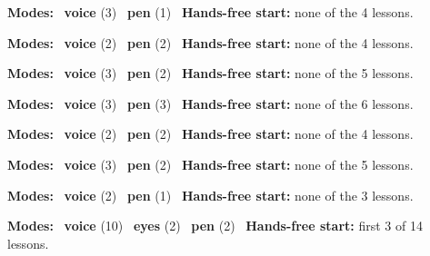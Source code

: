 \expandafter\def\csname hlchaptermodality5\endcsname{%
  {\small\noindent
    \textbf{Modes:} \hlvoicesign{}~\textbf{voice} (3) \quad \hlpensign{}~\textbf{pen} (1)\quad
    \hlvoicesign{}~\textbf{Hands-free start:} none of the 4 lessons.%
    \par}\medskip
}

\expandafter\def\csname hlchaptermodality6\endcsname{%
  {\small\noindent
    \textbf{Modes:} \hlvoicesign{}~\textbf{voice} (2) \quad \hlpensign{}~\textbf{pen} (2)\quad
    \hlvoicesign{}~\textbf{Hands-free start:} none of the 4 lessons.%
    \par}\medskip
}

\expandafter\def\csname hlchaptermodality7\endcsname{%
  {\small\noindent
    \textbf{Modes:} \hlvoicesign{}~\textbf{voice} (3) \quad \hlpensign{}~\textbf{pen} (2)\quad
    \hlvoicesign{}~\textbf{Hands-free start:} none of the 5 lessons.%
    \par}\medskip
}

\expandafter\def\csname hlchaptermodality8\endcsname{%
  {\small\noindent
    \textbf{Modes:} \hlvoicesign{}~\textbf{voice} (3) \quad \hlpensign{}~\textbf{pen} (3)\quad
    \hlvoicesign{}~\textbf{Hands-free start:} none of the 6 lessons.%
    \par}\medskip
}

\expandafter\def\csname hlchaptermodality9\endcsname{%
  {\small\noindent
    \textbf{Modes:} \hlvoicesign{}~\textbf{voice} (2) \quad \hlpensign{}~\textbf{pen} (2)\quad
    \hlvoicesign{}~\textbf{Hands-free start:} none of the 4 lessons.%
    \par}\medskip
}

\expandafter\def\csname hlchaptermodality10\endcsname{%
  {\small\noindent
    \textbf{Modes:} \hlvoicesign{}~\textbf{voice} (3) \quad \hlpensign{}~\textbf{pen} (2)\quad
    \hlvoicesign{}~\textbf{Hands-free start:} none of the 5 lessons.%
    \par}\medskip
}

\expandafter\def\csname hlchaptermodality11\endcsname{%
  {\small\noindent
    \textbf{Modes:} \hlvoicesign{}~\textbf{voice} (2) \quad \hlpensign{}~\textbf{pen} (1)\quad
    \hlvoicesign{}~\textbf{Hands-free start:} none of the 3 lessons.%
    \par}\medskip
}

\expandafter\def\csname hlchaptermodality12\endcsname{%
  {\small\noindent
    \textbf{Modes:} \hlvoicesign{}~\textbf{voice} (10) \quad \hlsightsign{}~\textbf{eyes} (2) \quad \hlpensign{}~\textbf{pen} (2)\quad
    \hlvoicesign{}~\textbf{Hands-free start:} first 3 of 14 lessons.%
    \par}\medskip
}

